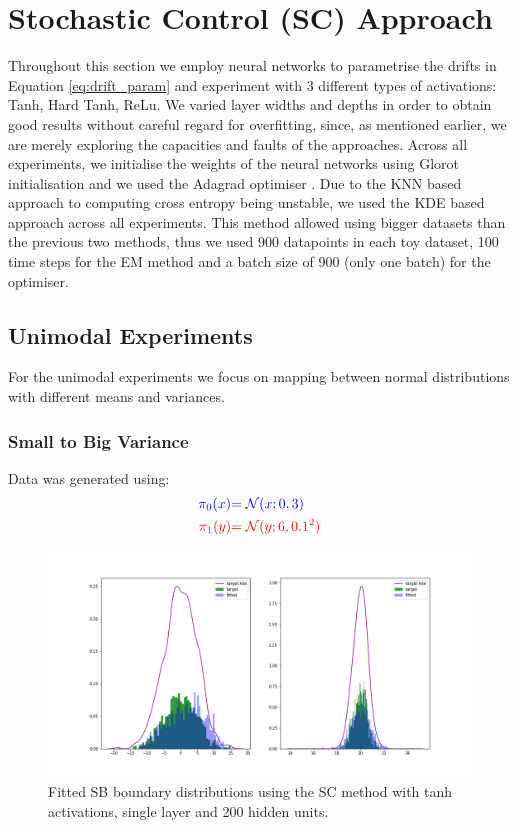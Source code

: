 \documentclass[a4paper,12pt,twoside,openright]{report}
\theoremstyle{definition}
\begin{document}
\section{Stochastic Control (SC)  Approach}


Throughout this section we employ neural networks \citep{lecun2015deep} to parametrise the drifts in Equation \ref{eq:drift_param} and experiment with 3 different types of activations: Tanh, Hard Tanh, ReLu.  We varied layer widths and depths in order to obtain good results without careful regard for overfitting, since, as mentioned earlier, we are merely exploring the capacities and faults of the approaches. Across all experiments, we initialise the weights of the neural networks using Glorot initialisation \citep{glorot2010understanding} and we used the Adagrad optimiser \citep{duchi2011adaptive}. Due to the KNN based approach to computing cross entropy being unstable, we used the KDE based approach across all experiments. This method allowed using bigger datasets than the previous two methods, thus we used 900 datapoints in each toy dataset, 100 time steps for the EM method and a batch size of 900 (only one batch) for the optimiser. 

\subsection{Unimodal Experiments}
For the unimodal experiments we focus on mapping between normal distributions with different means and variances.
\subsubsection{Small to Big Variance}

Data was generated using:
\begin{align*}
\color{blue}{\pi_0(x)} &\color{blue}{= {\mathcal{N}}(x; 0,  3)} \\
    \color{red}{\pi_1(y)} &\color{red}{= {\mathcal{N}}(y; 6, 0.1^2)} 
\end{align*}
\begin{figure}
    \centering
    \includegraphics[scale=0.4,trim={2.3cm 2cm 2cm 2cm}, clip]{images/Control/big_variance_tanh_marginals.png}
    \caption{ Fitted SB  boundary distributions using the SC method with tanh activations, single layer and 200 hidden units. }
    \label{fig:boundsbigvarnn}
\end{figure}
\end{document}

